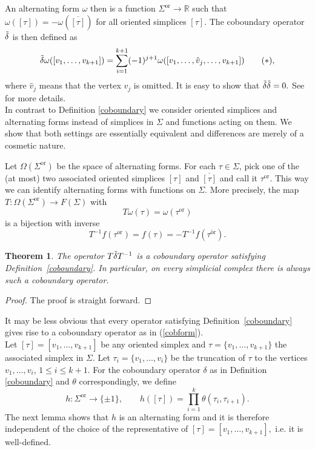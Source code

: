 \documentclass[10pt]{amsart}
\newtheorem{theorem}{Theorem}[section]
\theoremstyle{definition}
\newcommand{\F}{{F}}
\begin{document}
An alternating form $\omega$ then is a function $\Sigma^{\mathrm{or}}\to \mathbb{R}$ such that $\omega([\tau]) = -\omega(\overline{[\tau]})$ for all oriented simplices $[\tau].$ The coboundary operator $\Tilde{\delta}$ is then defined as 
\begin{equation}\label{cobform}
    \Tilde{\delta}\omega([v_1,\ldots,v_{k+1}]) = \sum_{i = 1}^{k+1}(-1)^{j+1}\omega([v_1,\ldots,\hat{v}_j,\ldots,v_{k+1}])\tag{$\ast$},
\end{equation}
where $\hat{v}_j$ means that the vertex $v_j$ is omitted. It is easy to show that $\Tilde{\delta}\Tilde{\delta} = 0.$ See \cite{HJ,HL,Parzanchevski} for more details.\\
In contrast to Definition \ref{coboundary} we consider oriented simplices and alternating forms instead of simplices in $\Sigma$ and functions acting on them. We show that both settings are essentially equivalent and differences are merely of a cosmetic nature. 

Let $\Omega(\Sigma^{\mathrm{or}})$ be the space of alternating forms. For each $\tau\in\Sigma$, pick one of the (at most) two associated oriented simplices $[\tau]$ and $\overline{[\tau]}$ and call it $\tau^{\mathrm{or}}.$ This way we can identify alternating forms with functions on $\Sigma.$ More precisely, the map 
$T:\Omega(\Sigma^{\mathrm{or}})\rightarrow \F(\Sigma)$ with
$$T\omega(\tau) = \omega(\tau^{\mathrm{or}})$$ is a bijection with inverse $$T^{-1}f(\tau^{\mathrm{or}}) = f(\tau)=-T^{-1}f(\overline{\tau^{\mathrm{or}}}).$$

\begin{theorem}The operator $T\Tilde{\delta} T^{-1}$ is a coboundary operator satisfying Definition~\ref{coboundary}. In particular, on every simplicial complex there is always such a coboundary operator. 
\end{theorem}
\begin{proof}
    The proof is straight forward.
\end{proof}

It may be less obvious that every operator satisfying Definition~\ref{coboundary} gives rise to a coboundary operator as in (\ref{cobform}).\\
Let $[\tau] = [v_1,\ldots,v_{k+1}]$ be any oriented simplex and $\tau = \lbrace v_1,\ldots,v_{k+1}\rbrace$ the associated simplex in $\Sigma.$ Let $\tau_i = \lbrace v_1,\ldots,v_i\rbrace$ be the truncation of $\tau$ to the vertices $v_1,\ldots,v_i$, $1\le i\le k+1$. For the coboundary operator $\delta$ as in Definition \ref{coboundary} and $\theta$ correspondingly, we  define
$$h:\Sigma^{\mathrm{or}}\to \{\pm 1\},\qquad h([\tau]) = \prod_{i = 1}^{k}\theta(\tau_i,\tau_{i+1}).$$
The next lemma shows that $h$ is an alternating form and it is therefore independent of the choice of the representative of $[\tau]=[v_{1},\ldots,v_{k+1}],$ i.e. it is well-defined.
\end{document}
